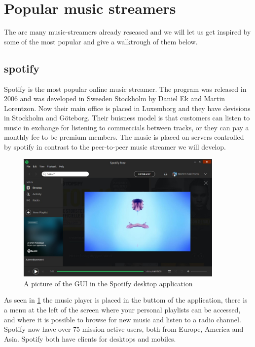 \section{Popular music streamers}
The are many music-streamers already reseased and we will let us get inspired by some of the most popular and give a walktrough of them below.

\subsection{spotify}
Spotify is the most popular online music streamer. The program was released in 2006 and was developed in Sweeden Stockholm by Daniel Ek and Martin Lorentzon. Now their main office is placed in Luxemborg and they have devisions in Stockholm and Göteborg. Their buisness model is that customers can listen to music in exchange for listening to commercials between tracks, or they can pay a monthly fee to be premium members.
The music is placed on servers controlled by spotify in contrast to the peer-to-peer music streamer we will develop.
\begin{figure}[h]
  \centering
    \includegraphics[width=0.9\textwidth]{gfx/Spotify_desktop.jpg}
  \caption{A picture of the GUI in the Spotify desktop application}
  \label{fig:spotify}
\end{figure}
As seen in \ref{fig:spotify} the music player is placed in the buttom of the application, there is a menu at the left of the screen where your personal playlists can be accessed, and where it is possible to browse for new music and listen to a radio channel.
Spotify now have over 75 mission active users, both from Europe, America and Asia. Spotify both have clients for desktops and mobiles.

